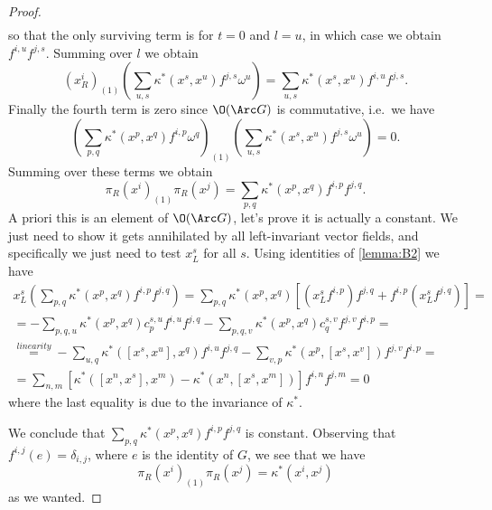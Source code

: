 \documentclass[a4paper, 10pt]{article}
\begin{document}
\begin{proof}
\begin{gather*}
                \end{gather*}
                so that the only surviving term is for $t = 0$ and $l = u$, in which case we obtain $f^{i,u}f^{j,s}$. Summing over $l$ we obtain \[(x^i_R)_{(1)}\left(\sum_{u,s} \kappa^*(x^s, x^u)f^{j,s}\omega^u \right) = \sum_{u,s}\kappa^*(x^s, x^u)f^{i,u}f^{j,s}. \] Finally the fourth term is zero since $\O(\Arc G)$ is commutative, i.e.\ we have \[\left(\sum_{p,q}\kappa^*(x^p, x^q)f^{i,p}\omega^q\right)_{(1)}\left(\sum_{u,s}\kappa^*(x^s, x^u)f^{j,s}\omega^u\right) = 0. \]
                Summing over these terms we obtain \[\pi_R(x^i)_{(1)}\pi_R(x^j) = \sum_{p,q} \kappa^*(x^p, x^q)f^{i,p}f^{j,q}. \] A priori this is an element of $\O(\Arc G)$, let's prove it is actually a constant. We just need to show it gets annihilated by all left-invariant vector fields, and specifically we just need to test $x^s_L$ for all $s$.
                Using identities of \cref{lemma:B2} we have 
                \begin{gather*}
                    x^s_L\left(\sum_{p,q}\kappa^*(x^p, x^q)f^{i,p}f^{j,q}\right) = \sum_{p,q}\kappa^*(x^p, x^q)\left[(x^s_Lf^{i,p})f^{j,q} + f^{i,p}(x^s_Lf^{j,q}) \right] = \\ 
                    = -\sum_{p,q, u} \kappa^*(x^p, x^q)c^{s,u}_pf^{i,u}f^{j,q} - \sum_{p,q,v} \kappa^*(x^p, x^q)c^{s,v}_qf^{j,v}f^{i,p} = \\ \stackrel{linearity}{=} -\sum_{u,q}\kappa^*([x^s, x^u], x^q)f^{i,u}f^{j,q} - \sum_{v, p}\kappa^*(x^p, [x^s, x^v])f^{j,v}f^{i,p} = \\ 
                    = \sum_{n,m}\left[\kappa^*([x^n, x^s], x^m) - \kappa^*(x^n, [x^s, x^m]) \right]f^{i,n}f^{j, m} = 0 
                \end{gather*}
                where the last equality is due to the invariance of $\kappa^*$.

                We conclude that $\sum_{p,q} \kappa^*(x^p, x^q)f^{i,p}f^{j,q}$ is constant. Observing that $f^{i,j}(e) = \delta_{i,j}$, where $e$ is the identity of $G$, we see that we have \[\pi_R(x^i)_{(1)}\pi_R(x^j) = \kappa^*(x^i, x^j) \] as we wanted.


\end{proof}
\end{document}
